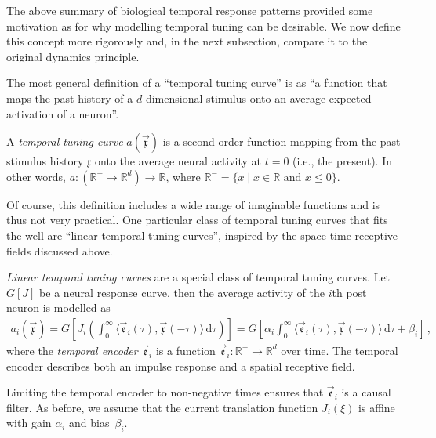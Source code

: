 The above summary of biological temporal response patterns provided some motivation as for why modelling temporal tuning can be desirable.
We now define this concept more rigorously and, in the next subsection, compare it to the original \NEF dynamics principle.

The most general definition of a \enquote{temporal tuning curve} is as \enquote{a function that maps the past history of a $d$-dimensional stimulus onto an average expected activation of a neuron}.
	
\begin{definition}
	\label{def:temporal_tuning_curve}
	A \emph{temporal tuning curve} $a(\vec{\mathfrak{x}})$ is a second-order function mapping from the past stimulus history $\mathfrak{x}$ onto the average neural activity at $t = 0$ (i.e., the present).
	In other words, $a : (\mathbb{R}^- \longrightarrow \mathbb{R}^d) \longrightarrow \mathbb{R}$, where $\mathbb{R}^- = \{ x \mid x \in \mathbb{R} \text{ and } x \leq 0 \}$.
\end{definition}

Of course, this definition includes a wide range of imaginable functions and is thus not very practical.
One particular class of temporal tuning curves that fits the \NEF well are \enquote{linear temporal tuning curves}, inspired by the space-time receptive fields discussed above.

\begin{definition}
	\label{def:linear_temporal_tuning}
	\emph{Linear temporal tuning curves} are a special class of temporal tuning curves.
	Let $G[J]$ be a neural response curve, then the average activity of the $i$th post neuron is modelled as
	\begin{align}
		a_i(\vec{\mathfrak{x}})
			= G\left[ J_i \left( \int_{0}^\infty \!\!\! \big\langle \vec{\mathfrak{e}}_i(\tau), \vec{\mathfrak{x}}(-\tau) \big\rangle 	\,\mathrm{d}\tau \right) \right]
		= G\left[ \alpha_i \! \int_{0}^\infty \!\!\! \big\langle \vec{\mathfrak{e}}_i(\tau), \vec{\mathfrak{x}}(-\tau) \big\rangle \,\mathrm{d}\tau + \beta_i \right] \,,
		\label{eqn:temporal_tuning_curve}
	\end{align}
	where the \emph{temporal encoder} $\vec{\mathfrak{e}}_i$ is a function $\vec{\mathfrak{e}}_i : \mathbb{R}^+ \longrightarrow \mathbb{R}^d$ over time. The temporal encoder describes both an impulse response and a spatial receptive field.
\end{definition}
\noindent Limiting the temporal encoder to non-negative times ensures that $\vec{\mathfrak{e}}_i$ is a causal filter.
As before, we assume that the current translation function $J_i(\xi)$ is affine with gain $\alpha_i$ and bias~$\beta_i$.

